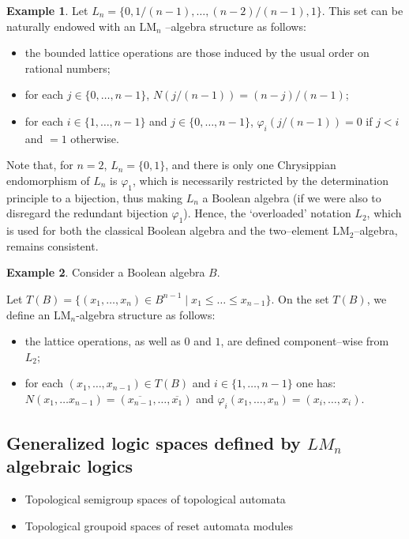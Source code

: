 \documentclass[12pt]{article}
\theoremstyle{plain}
\theoremstyle{definition}
\newtheorem{exe}{Example}[section]
\newcommand{\ov}{\overline}
\newcommand{\Ld}{L_{2}}
\renewcommand{\phi}{\varphi}
\newcommand{\w}{\wedge}
\renewcommand{\v}{\vee}
\renewcommand{\phi}{\varphi}
\newcommand{\phii}{\phi_{i}}
\def\leq{\leqslant}
\begin{document}
\begin{exe}\rm
Let $L_n=\{0,1/(n-1),\ldots,(n-2)/(n-1),1\}$. This set can be naturally endowed with an $\mbox{LM}_n$
--algebra structure as follows:
\begin{itemize}
\item the bounded lattice operations are those induced by the usual order on rational numbers;
\item for each $j\in\{0,\ldots,n-1\}$, $N(j/(n-1))=(n-j)/(n-1)$;
\item for each $i\in\{1,\ldots,n-1\}$ and $j\in\{0,\ldots,n-1\}$,
$\phii(j/(n-1))=0$ if $j<i$ and $=1$ otherwise.
\end{itemize}
\end{exe}
Note that, for $n=2$, $L_n=\{0,1\}$, and there is only one Chrysippian endomorphism of $L_n$ is $\phi_1$, which
is necessarily restricted by the determination principle to a bijection, thus making $L_n$ a Boolean algebra (if
we were also to disregard the redundant bijection $\phi_1$). Hence, the `overloaded' notation $L_2$, which is
used for both the classical Boolean algebra and the two--element $\mbox{LM}_2$--algebra, remains consistent.
\begin{exe}\rm
Consider a Boolean algebra $B$.


Let $T(B)=\{(x_1,\ldots,x_n)\in B^{n-1}\mid x_1\leq\ldots\leq x_{n-1}\}$. On the set $T(B)$, we define an $\mbox{LM}_n$-algebra structure as follows:

\begin{itemize}
\item the lattice operations, as well as $0$ and $1$, are defined component--wise from $\Ld$;

\item for each $(x_1,\ldots,x_{n-1})\in T(B)$ and $i\in\{1,\ldots,n-1\}$ one has:\\
$N(x_1,\ldots x_{n-1})=(\ov{x_{n-1}},\ldots,\ov{x_1})$ and $\phii(x_1,\ldots,x_n)=(x_i,\ldots,x_i) .$
\end{itemize}
\end{exe}

\subsection{Generalized logic spaces defined by $LM_n$ algebraic logics}

\begin{itemize}
\item Topological semigroup spaces of topological automata
\item Topological groupoid spaces of reset automata modules 
\end{itemize}
\end{document}
